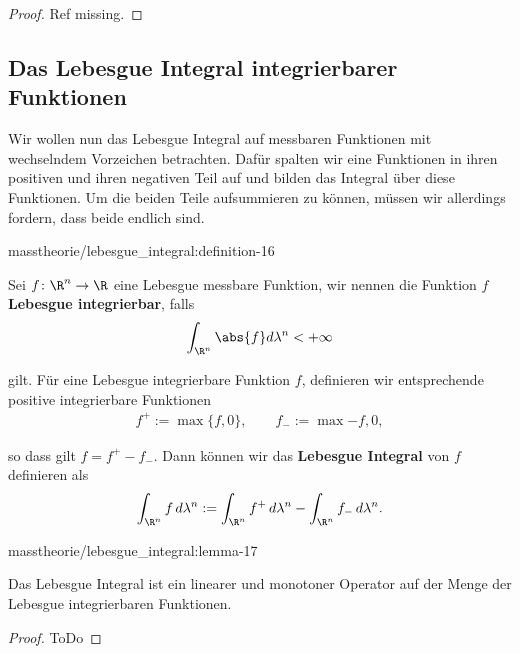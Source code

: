 \documentclass[letterpaper,10pt,german]{jupyterBook}
\begin{document}
\begin{proof}
 Ref missing.
\end{proof}


\subsection{Das Lebesgue Integral integrierbarer Funktionen}
\label{\detokenize{masstheorie/lebesgue_integral:das-lebesgue-integral-integrierbarer-funktionen}}
\par
Wir wollen nun das Lebesgue Integral auf messbaren Funktionen mit wechselndem Vorzeichen betrachten. Dafür spalten wir eine Funktionen in ihren positiven und ihren negativen Teil auf und bilden das Integral über diese Funktionen. Um die beiden Teile aufsummieren zu können, müssen wir allerdings fordern, dass beide endlich sind.
\begin{definition}{}{masstheorie/lebesgue_integral:definition-16}



\par
Sei \(f \colon \R^n \rightarrow \R\) eine Lebesgue messbare Funktion, wir nennen die Funktion \(f\) \textbf{Lebesgue integrierbar}, falls
\begin{align*}
\int_{\R^n} \abs{f} d\lambda^n < +\infty
\end{align*}
\par
gilt. Für eine Lebesgue integrierbare Funktion \(f\), definieren wir entsprechende positive integrierbare Funktionen
\begin{align*}
f^+ := \max \lbrace f, 0 \rbrace, \qquad f_- := \max{-f, 0},
\end{align*}
\par
so dass gilt \(f = f^+ - f_-\). Dann können wir das \textbf{Lebesgue Integral} von \(f\) definieren als
\begin{align*}
\int_{\R^n} f\, d\lambda^n := \int_{\R^n} f^+\, d\lambda^n - \int_{\R^n} f_-\, d\lambda^n.
\end{align*}\end{definition}
\begin{lemma}{}{masstheorie/lebesgue_integral:lemma-17}



\par
Das Lebesgue Integral ist ein linearer und monotoner Operator auf der Menge der Lebesgue integrierbaren Funktionen.
\end{lemma}

\begin{proof}
 ToDo
\end{proof}
\end{document}
